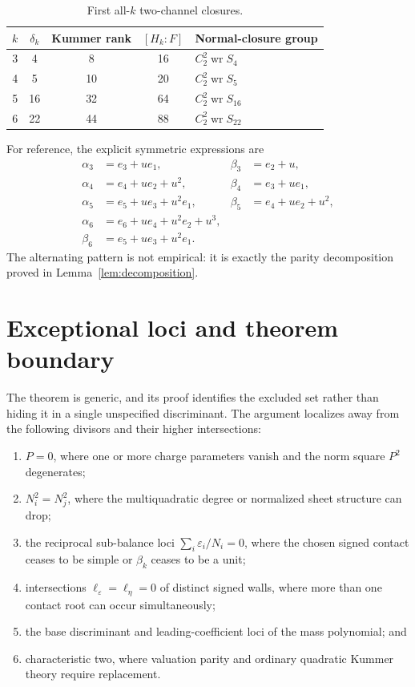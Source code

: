 \documentclass[11pt,a4paper]{article}
\theoremstyle{definition}
\theoremstyle{remark}
\newcommand{\wrp}{\mathop{\mathrm{wr}}}
\newcommand{\eps}{\varepsilon}
\begin{document}
\begin{table}[htbp]
\centering
\caption{First all-$k$ two-channel closures.}
\label{tab:lowk}
\renewcommand{\arraystretch}{1.18}
\begin{tabular}{@{}c c c c l@{}}
\toprule
$k$ & $\delta_k$ & Kummer rank & $[H_k:F]$ & Normal-closure group\\
\midrule
3 & 4  & 8  & 16 & $C_2^2\wrp S_4$\\
4 & 5  & 10 & 20 & $C_2^2\wrp S_5$\\
5 & 16 & 32 & 64 & $C_2^2\wrp S_{16}$\\
6 & 22 & 44 & 88 & $C_2^2\wrp S_{22}$\\
\bottomrule
\end{tabular}
\end{table}

For reference, the explicit symmetric expressions are
\begin{align*}
 \alpha_3&=e_3+ue_1,
 &\beta_3&=e_2+u,\\
 \alpha_4&=e_4+ue_2+u^2,
 &\beta_4&=e_3+ue_1,\\
 \alpha_5&=e_5+ue_3+u^2e_1,
 &\beta_5&=e_4+ue_2+u^2,\\
 \alpha_6&=e_6+ue_4+u^2e_2+u^3,\\
 \beta_6&=e_5+ue_3+u^2e_1.
\end{align*}
The alternating pattern is not empirical: it is exactly the parity
decomposition proved in Lemma~\ref{lem:decomposition}.

\section{Exceptional loci and theorem boundary}
\label{sec:exceptions}

The theorem is generic, and its proof identifies the excluded set rather
than hiding it in a single unspecified discriminant.  The argument localizes
away from the following divisors and their higher intersections:

\begin{enumerate}
\item $P=0$, where one or more charge parameters vanish and the norm square
      $P^2$ degenerates;
\item $N_i^2=N_j^2$, where the multiquadratic degree or normalized sheet
      structure can drop;
\item the reciprocal sub-balance loci
      $\sum_i\eps_i/N_i=0$, where the chosen signed contact ceases to be
      simple or $\beta_k$ ceases to be a unit;
\item intersections $\ell_\eps=\ell_\eta=0$ of distinct signed walls, where
      more than one contact root can occur simultaneously;
\item the base discriminant and leading-coefficient loci of the mass
      polynomial; and
\item characteristic two, where valuation parity and ordinary quadratic
      Kummer theory require replacement.
\end{enumerate}
\end{document}

